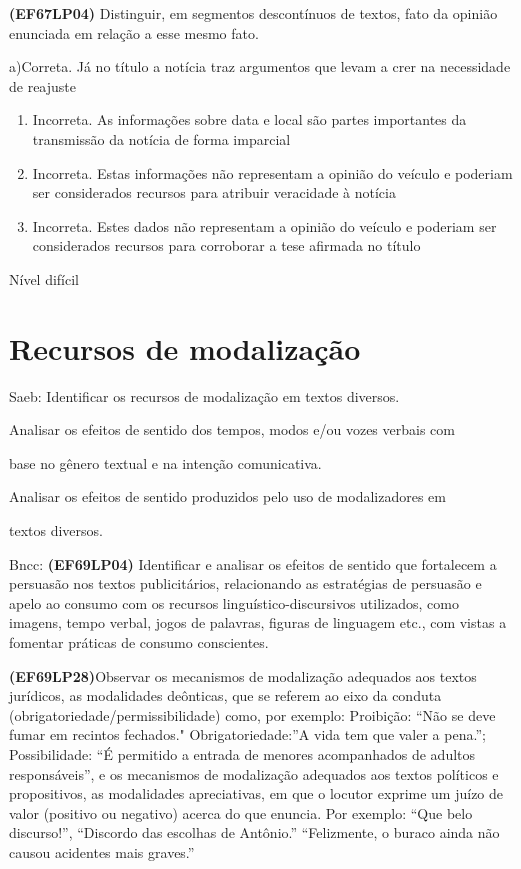{\textbf{(EF67LP04)} Distinguir, em segmentos descontínuos de textos,
fato da opinião enunciada em relação a esse mesmo fato.

a)Correta. Já no título a notícia traz argumentos que levam a crer na
necessidade de reajuste

\begin{enumerate}
\def\labelenumi{\arabic{enumi}.}
\item
  Incorreta. As informações sobre data e local são partes importantes da
  transmissão da notícia de forma imparcial
\item
  Incorreta. Estas informações não representam a opinião do veículo e
  poderiam ser considerados recursos para atribuir veracidade à notícia
\item
  Incorreta. Estes dados não representam a opinião do veículo e poderiam
  ser considerados recursos para corroborar a tese afirmada no título
\end{enumerate}

Nível difícil

\pagestyle{port}
\chapter{Recursos de modalização}

Saeb: Identificar os recursos de modalização em textos diversos.

Analisar os efeitos de sentido dos tempos, modos e/ou vozes verbais com

base no gênero textual e na intenção comunicativa.

Analisar os efeitos de sentido produzidos pelo uso de modalizadores em

textos diversos.

Bncc: \textbf{(EF69LP04)} Identificar e analisar os efeitos de sentido
que fortalecem a persuasão nos textos publicitários, relacionando as
estratégias de persuasão e apelo ao consumo com os recursos
linguístico-discursivos utilizados, como imagens, tempo verbal, jogos de
palavras, figuras de linguagem etc., com vistas a fomentar práticas de
consumo conscientes.

\textbf{(EF69LP28)}Observar os mecanismos de modalização adequados aos
textos jurídicos, as modalidades deônticas, que se referem ao eixo da
conduta (obrigatoriedade/permissibilidade) como, por exemplo: Proibição:
``Não se deve fumar em recintos fechados." Obrigatoriedade:''A vida tem
que valer a pena.''; Possibilidade: ``É permitido a entrada de menores
acompanhados de adultos responsáveis'', e os mecanismos de modalização
adequados aos textos políticos e propositivos, as modalidades
apreciativas, em que o locutor exprime um juízo de valor (positivo ou
negativo) acerca do que enuncia. Por exemplo: ``Que belo discurso!'',
``Discordo das escolhas de Antônio.'' ``Felizmente, o buraco ainda não
causou acidentes mais graves.''

}
